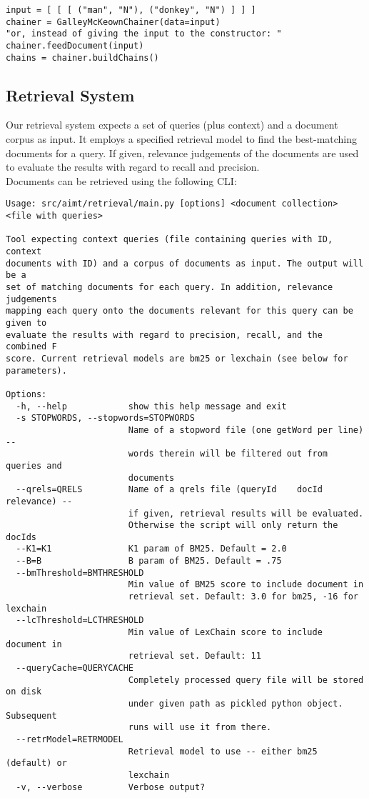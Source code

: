 \documentclass[11pt, a4paper, abstraction]{scrartcl}
\begin{document}
\lstset{language=Python}
\begin{lstlisting}
input = [ [ [ ("man", "N"), ("donkey", "N") ] ] ]
chainer = GalleyMcKeownChainer(data=input)
"or, instead of giving the input to the constructor: "
chainer.feedDocument(input)
chains = chainer.buildChains()
\end{lstlisting}

\subsection{Retrieval System}

Our retrieval system expects a set of queries (plus context) and a document corpus as input. It employs a specified retrieval model to find the best-matching documents for a query. If given, relevance judgements of the documents are used to evaluate the results with regard to recall and precision. \\   
Documents can be retrieved using the following CLI: 

\begin{verbatim} 
Usage: src/aimt/retrieval/main.py [options] <document collection> <file with queries>

Tool expecting context queries (file containing queries with ID, context
documents with ID) and a corpus of documents as input. The output will be a
set of matching documents for each query. In addition, relevance judgements
mapping each query onto the documents relevant for this query can be given to
evaluate the results with regard to precision, recall, and the combined F
score. Current retrieval models are bm25 or lexchain (see below for
parameters).

Options:
  -h, --help            show this help message and exit
  -s STOPWORDS, --stopwords=STOPWORDS
                        Name of a stopword file (one getWord per line) --
                        words therein will be filtered out from queries and
                        documents
  --qrels=QRELS         Name of a qrels file (queryId    docId   relevance) --
                        if given, retrieval results will be evaluated.
                        Otherwise the script will only return the docIds
  --K1=K1               K1 param of BM25. Default = 2.0
  --B=B                 B param of BM25. Default = .75
  --bmThreshold=BMTHRESHOLD
                        Min value of BM25 score to include document in
                        retrieval set. Default: 3.0 for bm25, -16 for lexchain
  --lcThreshold=LCTHRESHOLD
                        Min value of LexChain score to include document in
                        retrieval set. Default: 11
  --queryCache=QUERYCACHE
                        Completely processed query file will be stored on disk
                        under given path as pickled python object. Subsequent
                        runs will use it from there.
  --retrModel=RETRMODEL
                        Retrieval model to use -- either bm25 (default) or
                        lexchain
  -v, --verbose         Verbose output?
\end{verbatim}
\noindent
\end{document}
